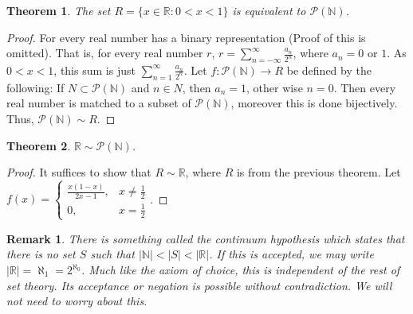 \documentclass[12pt,oneside]{book}
\theoremstyle{mystyle}
\newtheorem{theorem}{Theorem}[section]
\newtheorem{remark}{Remark}[section]
\begin{document}
\begin{theorem}
The set $R=\{x\in \mathbb{R}:0<x<1\}$ is equivalent to $\mathcal{P}(\mathbb{N})$.
\end{theorem}
\begin{proof}
For every real number has a binary representation (Proof of this is omitted). That is, for every real number $r$, $ r = \sum_{n=-\infty}^{\infty} \frac{a_n}{2^n}$, where $a_n = 0$ or $1$. As $0<x<1$, this sum is just $\sum_{n=1}^{\infty} \frac{a_n}{2^n}$. Let $f:\mathcal{P}(\mathbb{N})\rightarrow R$ be defined by the following: If $N\subset \mathcal{P}(\mathbb{N})$ and $n\in N$, then $a_n = 1$, other wise $n=0$. Then every real number is matched to a subset of $\mathcal{P}(\mathbb{N})$, moreover this is done bijectively. Thus, $\mathcal{P}(\mathbb{N})\sim R$.
\end{proof}

\begin{theorem}
$\mathbb{R} \sim \mathcal{P}(\mathbb{N})$.
\end{theorem}
\begin{proof}
It suffices to show that $R\sim \mathbb{R}$, where $R$ is from the previous theorem. Let $f(x) = \begin{cases} \frac{x(1-x)}{2x-1}, & x \ne \frac{1}{2} \\ 0, & x = \frac{1}{2}\end{cases}$.
\end{proof}

\begin{remark}
There is something called the continuum hypothesis which states that there is no set $S$ such that $|\mathbb{N}| < |S| < |\mathbb{R}|$. If this is accepted, we may write $|\mathbb{R}| = \aleph_1 = 2^{\aleph_0}$. Much like the axiom of choice, this is independent of the rest of set theory. Its acceptance or negation is possible without contradiction. We will not need to worry about this.
\end{remark}
%
\end{document}
